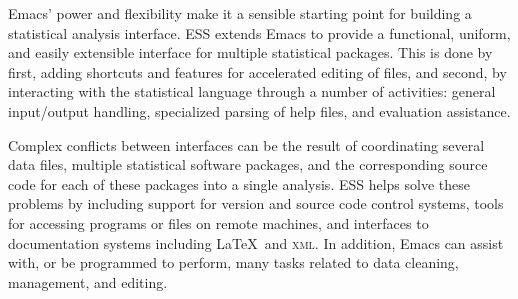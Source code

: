 \documentclass{article}
\newcommand{\stexttt}[1]{{\small\texttt{#1}}}
\begin{document}
Emacs' power and flexibility make it a sensible starting point for
building a statistical analysis interface.  ESS extends Emacs to
provide a functional, uniform, and easily extensible interface for
multiple statistical packages.  This is done by first, adding
shortcuts and features for accelerated editing of files, and second,
by interacting with the statistical language through a number of
activities: general input/output handling, specialized
parsing of help files, and evaluation assistance.

Complex conflicts between interfaces can be the result of coordinating
several data files, multiple statistical software packages, and the
corresponding source code for each of these packages into a single
analysis.  ESS helps solve these problems by including support for
version and source code control systems, tools for accessing programs
or files on remote machines, and interfaces to documentation systems
including \LaTeX\ and \textsc{xml}.  In addition, Emacs can assist
with, or be programmed to perform, many tasks related to data
cleaning, management, and editing.  





\end{document}
